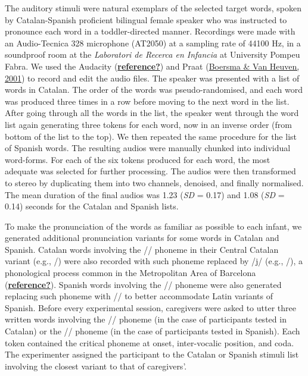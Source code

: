 \documentclass[
  letterpaper,
  DIV=11,
  numbers=noendperiod]{scrartcl}
\begin{document}
The auditory stimuli were natural exemplars of the selected target
words, spoken by Catalan-Spanish proficient bilingual female speaker who
was instructed to pronounce each word in a toddler-directed manner.
Recordings were made with an Audio-Tecnica 328 microphone (AT2050) at a
sampling rate of 44100 Hz, in a soundproof room at the \emph{Laboratori
de Recerca en Infancia} at University Pompeu Fabra. We used the Audacity
(\protect\hyperlink{ref-reference}{\textbf{reference?}}) and Praat
(\protect\hyperlink{ref-boersma2001speak}{Boersma \& Van Heuven, 2001})
to record and edit the audio files. The speaker was presented with a
list of words in Catalan. The order of the words was pseudo-randomised,
and each word was produced three times in a row before moving to the
next word in the list. After going through all the words in the list,
the speaker went through the word list again generating three tokens for
each word, now in an inverse order (from bottom of the list to the top).
We then repeated the same procedure for the list of Spanish words. The
resulting audios were manually chunked into individual word-forms. For
each of the six tokens produced for each word, the most adequate was
selected for further processing. The audios were then transformed to
stereo by duplicating them into two channels, denoised, and finally
normalised. The mean duration of the final audios was 1.23 (\emph{SD} =
0.17) and 1.08 (\emph{SD} = 0.14) seconds for the Catalan and Spanish
lists.

To make the pronunciation of the words as familiar as possible to each
infant, we generated additional pronunciation variants for some words in
Catalan and Spanish. Catalan words involving the // phoneme
in their Central Catalan variant (e.g., /) were also
recorded with such phoneme replaced by /j/ (e.g., /), a
phonological process common in the Metropolitan Area of Barcelona
(\protect\hyperlink{ref-reference}{\textbf{reference?}}). Spanish words
involving the // phoneme were also generated replacing such
phoneme with // to better accommodate Latin variants of
Spanish. Before every experimental session, caregivers were asked to
utter three written words involving the // phoneme (in the
case of participants tested in Catalan) or the // phoneme (in
the case of participants tested in Spanish). Each token contained the
critical phoneme at onset, inter-vocalic position, and coda. The
experimenter assigned the participant to the Catalan or Spanish stimuli
list involving the closest variant to that of caregivers'.
\end{document}
